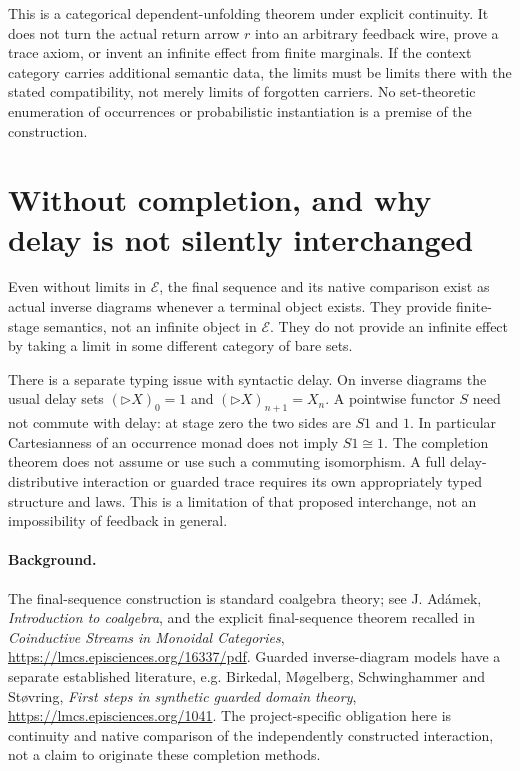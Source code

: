 \documentclass[11pt]{article}
\begin{document}
This is a categorical dependent-unfolding theorem under explicit continuity. It does not turn the actual return arrow $r$ into an arbitrary feedback wire, prove a trace axiom, or invent an infinite effect from finite marginals. If the context category carries additional semantic data, the limits must be limits there with the stated compatibility, not merely limits of forgotten carriers. No set-theoretic enumeration of occurrences or probabilistic instantiation is a premise of the construction.

\section{Without completion, and why delay is not silently interchanged}
Even without limits in $\mathcal E$, the final sequence and its native comparison exist as actual inverse diagrams whenever a terminal object exists. They provide finite-stage semantics, not an infinite object in $\mathcal E$. They do not provide an infinite effect by taking a limit in some different category of bare sets.

There is a separate typing issue with syntactic delay. On inverse diagrams the usual delay sets $(\triangleright X)_0=1$ and $(\triangleright X)_{n+1}=X_n$. A pointwise functor $S$ need not commute with delay: at stage zero the two sides are $S1$ and $1$. In particular Cartesianness of an occurrence monad does not imply $S1\cong1$. The completion theorem does not assume or use such a commuting isomorphism. A full delay-distributive interaction or guarded trace requires its own appropriately typed structure and laws. This is a limitation of that proposed interchange, not an impossibility of feedback in general.

\paragraph{Background.} The final-sequence construction is standard coalgebra theory; see J. Ad\'amek, \emph{Introduction to coalgebra}, and the explicit final-sequence theorem recalled in \emph{Coinductive Streams in Monoidal Categories}, \url{https://lmcs.episciences.org/16337/pdf}. Guarded inverse-diagram models have a separate established literature, e.g. Birkedal, M\o gelberg, Schwinghammer and St\o vring, \emph{First steps in synthetic guarded domain theory}, \url{https://lmcs.episciences.org/1041}. The project-specific obligation here is continuity and native comparison of the independently constructed interaction, not a claim to originate these completion methods.
\end{document}
